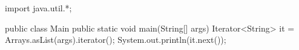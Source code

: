 \begin{code}
import java.util.*;

public class Main {
	public static void main(String[] args) {
    Iterator<String> it = Arrays.asList(args).iterator();
    System.out.println(it.next());
	}
}\end{code}

\lstset{caption=Original Mungo output}
\begin{code}
\end{code}

\lstset{caption=New Mungo output}
\begin{code}
\end{code}

